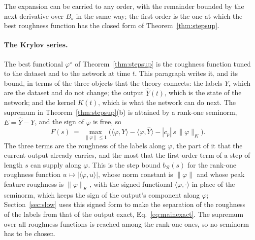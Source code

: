 \documentclass[11pt]{article}
\theoremstyle{definition}
\theoremstyle{remark}
\newcommand{\Rgh}{\mathcal{R}}           %
\newcommand{\ip}[2]{\langle #1,#2\rangle}
\begin{document}
The expansion can be carried to any order, with the remainder bounded by the next derivative over $B_s$ in the same way; the first order is the one at which the best roughness function has the closed form of Theorem~\ref{thm:stepsup}.

\paragraph{The Krylov series.}
The best functional $\varphi^\star$ of Theorem~\ref{thm:stepsup} is the roughness function tuned to the dataset and to the network at time $t$.
This paragraph writes it, and its bound, in terms of the three objects that the theory connects: the labels $Y$, which are the dataset and do not change; the output $\hat Y(t)$, which is the state of the network; and the kernel $K(t)$, which is what the network can do next.
The supremum in Theorem~\ref{thm:stepsup}(b) is attained by a rank-one seminorm, $E = \hat Y - Y$, and the sign of $\varphi$ is free, so
\begin{equation}\label{eq:Fdataset}
F(s) \ =\ \max_{\|\varphi\|\le 1}\Big(\ip{\varphi}{Y} - \ip{\varphi}{\hat Y} - |c_p|\,s\,\|\varphi\|_K\Big).
\end{equation}
The three terms are the roughness of the labels along $\varphi$, the part of it that the current output already carries, and the most that the first-order term of a step of length $s$ can supply along $\varphi$.
This is the step bound $b_\Rgh(s)$ for the rank-one roughness function $u \mapsto |\ip{\varphi}{u}|$, whose norm constant is $\|\varphi\|$ and whose peak feature roughness is $\|\varphi\|_K$, with the signed functional $\ip{\varphi}{\cdot}$ in place of the seminorm, which keeps the sign of the output's component along $\varphi$; Section~\ref{sec:slow} uses this signed form to make the separation of the roughness of the labels from that of the output exact, Eq.~\eqref{eq:mainexact}.
The supremum over all roughness functions is reached among the rank-one ones, so no seminorm has to be chosen.
\end{document}
